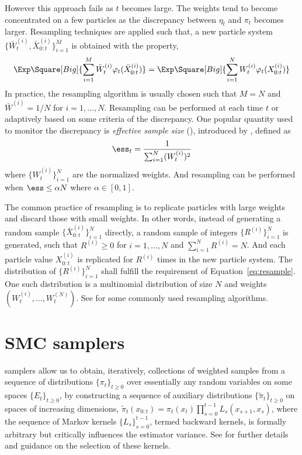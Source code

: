 However this approach fails as $t$ becomes large. The weights tend to become
concentrated on a few particles as the discrepancy between $\eta_t$ and $\pi_t$
becomes larger. Resampling techniques are applied such that, a new particle
system $\{\bar{W}_t^{(i)},\bar{X}_{0:t}^{(i)}\}_{i=1}^M$ is obtained with the
property,
\begin{equation}
  \Exp\Square[Big]{\sum_{i=1}^M\bar{W}_t^{(i)}\varphi_t(\bar{X}_{0:t}^{(i)})} =
  \Exp\Square[Big]{\sum_{i=1}^NW_t^{(i)}\varphi_t(X_{0:t}^{(i)})}
  \label{eq:resample}
\end{equation}
In practice, the resampling algorithm is usually chosen such that $M = N$ and
$\bar{W}^{(i)} = 1/N$ for $i=1,\dots,N$. Resampling can be performed at each
time $t$ or adaptively based on some criteria of the discrepancy. One popular
quantity used to monitor the discrepancy is \emph{effective sample size}
(\ess), introduced by \textcite{Liu:1998iu}, defined as
\begin{equation}
  \ess_t = \frac{1}{\sum_{i=1}^N (W_t^{(i)})^2}
\end{equation}
where $\{W_t^{(i)}\}_{i=1}^N$ are the normalized weights. And resampling can be
performed when $\ess\le \alpha N$ where $\alpha\in[0,1]$.

The common practice of resampling is to replicate particles with large weights
and discard those with small weights. In other words, instead of generating a
random sample $\{\bar{X}_{0:t}^{(i)}\}_{i=1}^N$ directly, a random sample of
integers $\{R^{(i)}\}_{i=1}^N$ is generated, such that $R^{(i)} \ge 0$ for $i =
1,\dots,N$ and $\sum_{i=1}^N R^{(i)} = N$. And each particle value
$X_{0:t}^{(i)}$ is replicated for $R^{(i)}$ times in the new particle system.
The distribution of $\{R^{(i)}\}_{i=1}^N$ shall fulfill the requirement of
Equation~\eqref{eq:resample}. One such distribution is a multinomial
distribution of size $N$ and weights $(W_t^{(i)},\dots,W_t^{(N)})$. See
\textcite{Douc:2005wa} for some commonly used resampling algorithms.

\section{SMC samplers}
\label{sec:SMC Samplers}

\smc samplers allow us to obtain, iteratively, collections of weighted samples
from a sequence of distributions $\{\pi_t\}_{t\ge0}$ over essentially any
random variables on some spaces $\{E_t\}_{t\ge0}$, by constructing a sequence
of auxiliary distributions $\{\tilde\pi_t\}_{t\ge0}$ on spaces of increasing
dimensions, $\tilde\pi_t(x_{0:t})=\pi_t (x_t) \prod_{s=0}^{t-1}
L_s(x_{s+1},x_s)$, where the sequence of Markov kernels $\{L_s\}_{s=0}^{t-1}$,
termed backward kernels, is formally arbitrary but critically influences the
estimator variance. See \textcite{DelMoral:2006hc} for further details and
guidance on the selection of these kernels.

